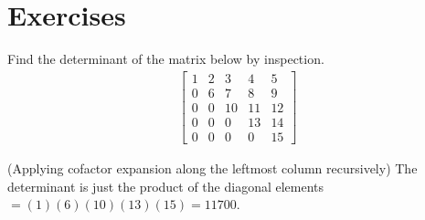 \section{Exercises}

\begin{Exercise}
Find the determinant of the matrix below by inspection.
\begin{align*}
\begin{bmatrix}
1 & 2 & 3 & 4 & 5 \\
0 & 6 & 7 & 8 & 9 \\
0 & 0 & 10 & 11 & 12 \\
0 & 0 & 0 & 13 & 14 \\
0 & 0 & 0 & 0 & 15
\end{bmatrix}    
\end{align*}
\end{Exercise}
\begin{Answer}
(Applying cofactor expansion along the leftmost column recursively) The determinant is just the product of the diagonal elements $= (1)(6)(10)(13)(15) = 11700$.    
\end{Answer}

